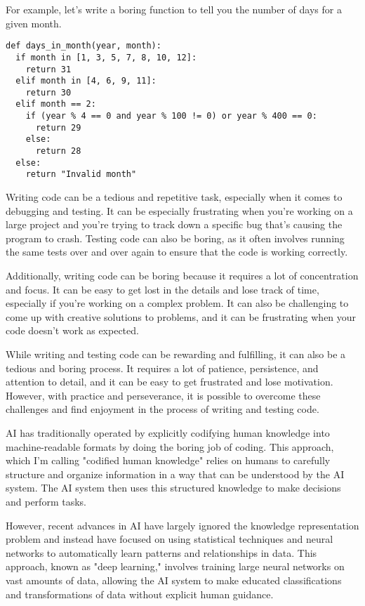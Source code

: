 For example, let's write a boring function to tell you the number of days for a given month. 

\begin{lstlisting}[style=kaolstplain,linewidth=1.5\textwidth]
def days_in_month(year, month):
  if month in [1, 3, 5, 7, 8, 10, 12]:
    return 31
  elif month in [4, 6, 9, 11]:
    return 30
  elif month == 2:
    if (year % 4 == 0 and year % 100 != 0) or year % 400 == 0:
      return 29
    else:
      return 28
  else:
    return "Invalid month"

\end{lstlisting}

Writing code can be a tedious and repetitive task, especially when it comes to debugging and testing. It can be especially frustrating when you're working on a large project and you're trying to track down a specific bug that's causing the program to crash. Testing code can also be boring, as it often involves running the same tests over and over again to ensure that the code is working correctly.

Additionally, writing code can be boring because it requires a lot of concentration and focus. It can be easy to get lost in the details and lose track of time, especially if you're working on a complex problem. It can also be challenging to come up with creative solutions to problems, and it can be frustrating when your code doesn't work as expected.

While writing and testing code can be rewarding and fulfilling, it can also be a tedious and boring process. It requires a lot of patience, persistence, and attention to detail, and it can be easy to get frustrated and lose motivation. However, with practice and perseverance, it is possible to overcome these challenges and find enjoyment in the process of writing and testing code.

AI has traditionally operated by explicitly codifying human knowledge into machine-readable formats by doing the boring job of coding. This approach, which I'm calling "codified human knowledge" relies on humans to carefully structure and organize information in a way that can be understood by the AI system. The AI system then uses this structured knowledge to make decisions and perform tasks.

However, recent advances in AI have largely ignored the knowledge representation problem and instead have focused on using statistical techniques and neural networks to automatically learn patterns and relationships in data. This approach, known as "deep learning," involves training large neural networks on vast amounts of data, allowing the AI system to make educated classifications and transformations of data without explicit human guidance.

